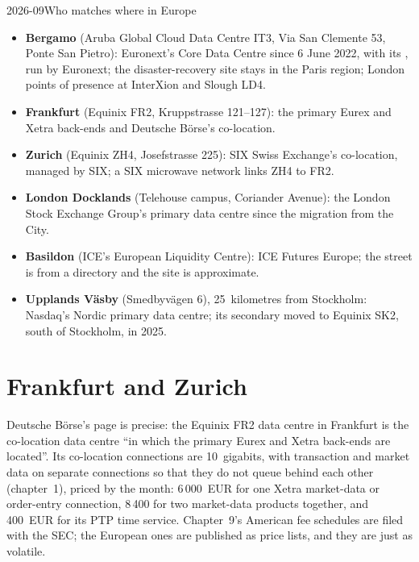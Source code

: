 \begin{dated}{2026-09}{Who matches where in Europe}\label{dat:nw:the-european-map:sites}
\begin{itemize}
\item \textbf{Bergamo} (Aruba Global Cloud Data Centre IT3, Via San Clemente 53, Ponte San Pietro): Euronext's Core Data Centre since 6 June
  2022, with its , run by Euronext; the disaster-recovery site stays in the Paris region; London points of presence at InterXion
  and Slough LD4.
\item \textbf{Frankfurt} (Equinix FR2, Kruppstrasse 121--127): the primary Eurex and Xetra back-ends and Deutsche Börse's co-location.
\item \textbf{Zurich} (Equinix ZH4, Josefstrasse 225): SIX Swiss Exchange's co-location, managed by SIX; a SIX microwave network links ZH4
  to FR2.
\item \textbf{London Docklands} (Telehouse campus, Coriander Avenue): the London Stock Exchange Group's primary data centre since the
  migration from the City.
\item \textbf{Basildon} (ICE's European Liquidity Centre): ICE Futures Europe; the street is from a directory and the site is approximate.
\item \textbf{Upplands Väsby} (Smedbyvägen 6), 25~kilometres from Stockholm: Nasdaq's Nordic primary data centre; its secondary moved to
  Equinix SK2, south of Stockholm, in 2025.
\end{itemize}
\end{dated}

\section{Frankfurt and Zurich}

Deutsche Börse's page is precise: the Equinix FR2 data centre in Frankfurt is the co-location data centre ``in which the primary Eurex and
Xetra back-ends are located''. Its co-location connections are 10~gigabits, with transaction and market data on separate connections so that
they do not queue behind each other (chapter~1), priced by the month: 6\,000~EUR for one Xetra market-data or order-entry connection, 8\,400
for two market-data products together, and 400~EUR for its PTP time service. Chapter~9's American fee schedules are filed with the SEC; the
European ones are published as price lists, and they are just as volatile.

